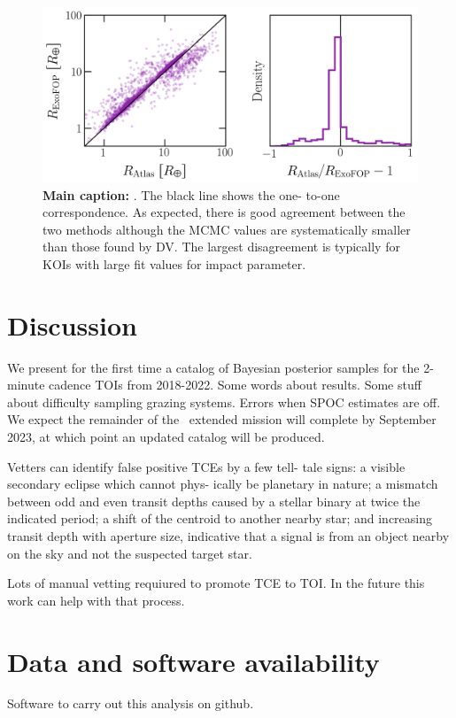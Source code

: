 \documentclass[floatfix,ApJL,twocolumn]{aastex631}
\begin{document}
\begin{figure}
  \includegraphics[width=\linewidth]{figures/radius_error.png}
  \caption{\textbf{Main caption:} . The black line shows the one- to-one correspondence. As expected, there is good agreement between the two methods although the MCMC values are systematically smaller than those found by DV. The largest disagreement is typically for KOIs with large fit values for impact parameter. }
  \label{fig:}
\end{figure}





\section{Discussion}\label{sec:conclusion}
We present for the first time a catalog of Bayesian posterior samples for the 2-minute cadence TOIs from 2018-2022.
Some words about results.
Some stuff about difficulty sampling grazing systems.
Errors when SPOC estimates are off.
We expect the remainder of the \tess\ extended mission will complete by September 2023, at which point an updated catalog will be produced.

Vetters can identify false positive TCEs by a few tell- tale signs: a visible secondary eclipse which cannot phys- ically be planetary in nature; a mismatch between odd and even transit depths caused by a stellar binary at twice the indicated period; a shift of the centroid to another nearby star; and increasing transit depth with aperture size, indicative that a signal is from an object nearby on the sky and not the suspected target star.

Lots of manual vetting requiured to promote TCE to TOI. In the future this work can help with that process.


\section{Data and software availability}\label{sec:data}
Software to carry out this analysis on github.
\end{document}
